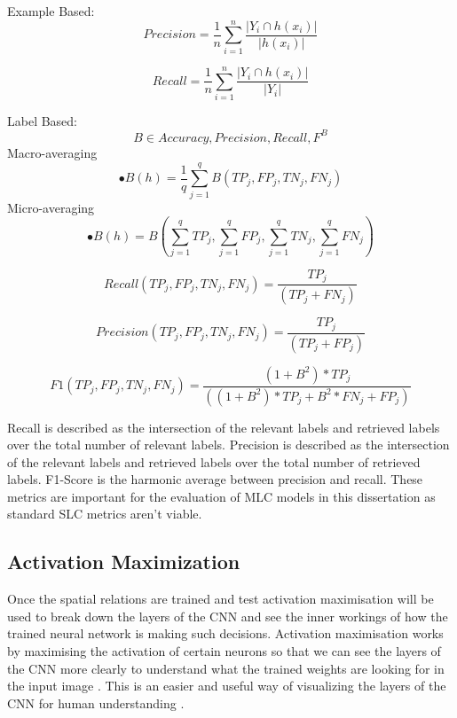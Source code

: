 \documentclass{csfyp}
\begin{document}
Example Based:
\begin{equation}
Precision = \frac{1}{n}\sum_{i=1}^{n}\frac{|Y_{i}\cap h(x_{i})|}{|h(x_{i})|}
\end{equation}

\begin{equation}
Recall = \frac{1}{n}\sum_{i=1}^{n}\frac{|Y_{i}\cap h(x_{i})|}{|Y_{i}|}
\end{equation}

Label Based:
\begin{equation}
B \in { Accuracy, Precision, Recall, F^B} 
\end{equation}
Macro-averaging
\begin{equation}
•B(h) = \frac{1}{q}\sum_{j=1}^{q} B(TP_j,FP_j,TN_j,FN_j)
\end{equation}
Micro-averaging
\begin{equation}
•B(h) = B(\sum_{j=1}^{q} TP_j,\sum_{j=1}^{q} FP_j,\sum_{j=1}^{q} TN_j,\sum_{j=1}^{q} FN_j)
\end{equation}

\begin{equation}
Recall(TP_j,FP_j,TN_j,FN_j) = \frac{TP_j}{(TP_j + FN_j)}
\end{equation}

\begin{equation}
Precision(TP_j,FP_j,TN_j,FN_j) = \frac{TP_j}{(TP_j + FP_j)}
\end{equation}

\begin{equation}
F1(TP_j,FP_j,TN_j,FN_j) = \frac{(1+B^2)*TP_j}{((1+B^2)*TP_j+B^2*FN_j+FP_j)}
\end{equation}


Recall is described as the intersection of the relevant labels and retrieved labels over the total number of relevant labels. Precision is described as the intersection of the relevant labels and retrieved labels over the total number of retrieved labels. F1-Score is the harmonic average between precision and recall. These metrics are important for the evaluation of MLC models in this dissertation as standard SLC metrics aren't viable.

\subsection{Activation Maximization}
Once the spatial relations are trained and test activation maximisation will be used to break down the layers of the CNN and see the inner workings of how the trained neural network is making such decisions. Activation maximisation works by maximising the activation of certain neurons so that we can see the layers of the CNN more clearly to understand what the trained weights are looking for in the input image . This is an easier and useful way of visualizing the layers of the CNN for human understanding . 
\end{document}
